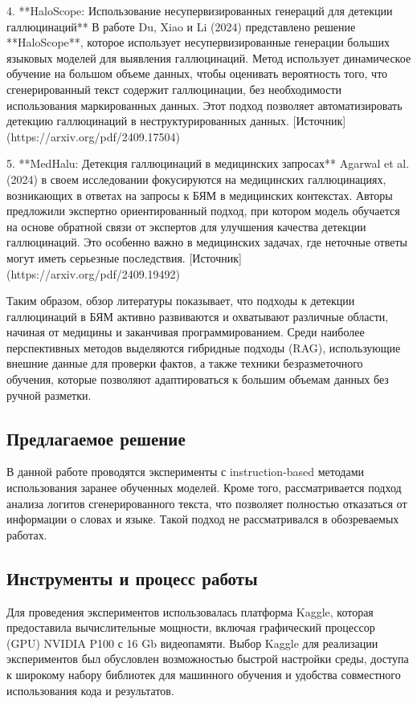 \documentclass[12pt]{article}
\begin{document}
4. **HaloScope: Использование несупервизированных генераций для детекции галлюцинаций**  
В работе Du, Xiao и Li (2024) представлено решение **HaloScope**, которое использует несупервизированные генерации больших языковых моделей для выявления галлюцинаций. Метод использует динамическое обучение на большом объеме данных, чтобы оценивать вероятность того, что сгенерированный текст содержит галлюцинации, без необходимости использования маркированных данных. Этот подход позволяет автоматизировать детекцию галлюцинаций в неструктурированных данных. [Источник](https://arxiv.org/pdf/2409.17504)

5. **MedHalu: Детекция галлюцинаций в медицинских запросах**  
Agarwal et al. (2024) в своем исследовании фокусируются на медицинских галлюцинациях, возникающих в ответах на запросы к БЯМ в медицинских контекстах. Авторы предложили экспертно ориентированный подход, при котором модель обучается на основе обратной связи от экспертов для улучшения качества детекции галлюцинаций. Это особенно важно в медицинских задачах, где неточные ответы могут иметь серьезные последствия. [Источник](https://arxiv.org/pdf/2409.19492)

Таким образом, обзор литературы показывает, что подходы к детекции галлюцинаций в БЯМ активно развиваются и охватывают различные области, начиная от медицины и заканчивая программированием. Среди наиболее перспективных методов выделяются гибридные подходы (RAG), использующие внешние данные для проверки фактов, а также техники безразметочного обучения, которые позволяют адаптироваться к большим объемам данных без ручной разметки.

\subsection{Предлагаемое решение}
В данной работе проводятся эксперименты с instruction-based методами использования заранее обученных моделей. Кроме того, рассматривается подход анализа логитов сгенерированного текста, что позволяет полностью отказаться от информации о словах и языке. Такой подход не рассматривался в обозреваемых работах.

\subsection{Инструменты и процесс работы}
Для проведения экспериментов использовалась платформа Kaggle, которая предоставила вычислительные мощности, включая графический процессор (GPU) NVIDIA P100 с 16 Gb видеопамяти. Выбор Kaggle для реализации экспериментов был обусловлен возможностью быстрой настройки среды, доступа к широкому набору библиотек для машинного обучения и удобства совместного использования кода и результатов.
\end{document}
